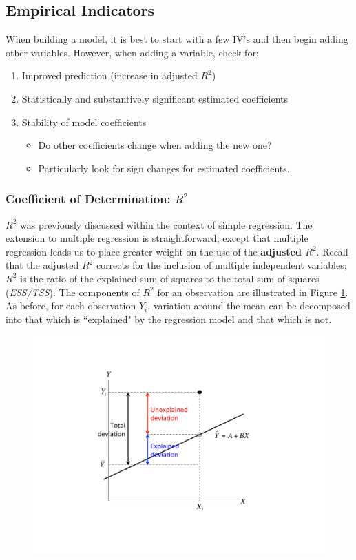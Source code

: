 \documentclass[11pt,openany]{book}\usepackage[]{graphicx}\usepackage[]{color}
\begin{document}
\subsection{Empirical Indicators}

When building a model, it is best to start with a few IV's and then begin adding other variables. However, when adding a variable, check for: 
\begin{enumerate}
\item Improved prediction (increase in adjusted $R^2$)
\item Statistically and substantively significant estimated coefficients
\item Stability of model coefficients
  \begin{itemize}
\item Do other coefficients change when adding the new one?
\item Particularly look for sign changes for estimated coefficients.
  \end{itemize}
  \end{enumerate}

\subsubsection{Coefficient of Determination: $R^2$}

$R^2$ was previously discussed within the context of simple regression. The extension to multiple regression is straightforward, except that multiple regression leads us to place greater weight on the use of the \textbf{adjusted $R^2$}. Recall that the adjusted $R^2$ corrects for the inclusion of multiple independent variables; $R^{2}$ is the ratio of the explained sum of squares to the total sum of squares (\textit{ESS/TSS}). The components of $R^{2}$ for an observation are illustrated in Figure \ref{fig:rsq}. As before, for each observation $Y_{i}$, variation around the mean can be decomposed into that which is ``explained" by the regression model and that which is not.  
\begin{figure}
  \centering
  \includegraphics[width=5in]{13_ModelFit/rsquared.pdf}
  \caption[$R^{2}$]{ \label{fig:rsq}}
\end{figure}
\end{document}
